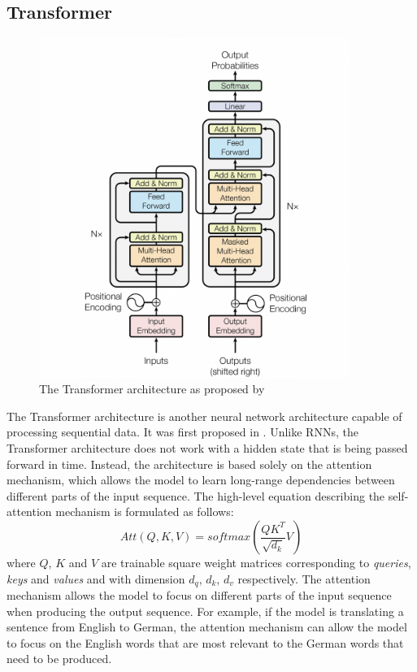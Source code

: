 \subsection{Transformer}
\label{background:trafo}
\begin{figure}[h]
    \centering
    \includegraphics[width=0.9\textwidth]{images/transfo-arch.png}
    \caption{The Transformer architecture as proposed by \citep{vaswani2017attention}}
    \label{fig:trafo}
\end{figure}
The Transformer architecture is another neural network architecture capable of processing sequential data.
It was first proposed in \citet{vaswani2017attention}.
Unlike RNNs, the Transformer architecture does not work with a hidden state that is being passed forward in time.
Instead, the architecture is based solely on the attention mechanism, which allows the model to learn long-range dependencies between different parts of the input sequence.
The high-level equation describing the self-attention mechanism is formulated as follows:
\begin{equation*}
    Att(Q,K,V) = softmax(\frac{QK^T}{\sqrt{d_k}}V)
\end{equation*}
where $Q$, $K$ and $V$ are trainable square weight matrices corresponding to \emph{queries}, \emph{keys} and \emph{values} and with dimension $d_q$, $d_k$, $d_v$ respectively.
The attention mechanism allows the model to focus on different parts of the input sequence when producing the output sequence.
For example, if the model is translating a sentence from English to German, the attention mechanism can allow the model to focus on the English words that are most relevant to the German words that need to be produced.

